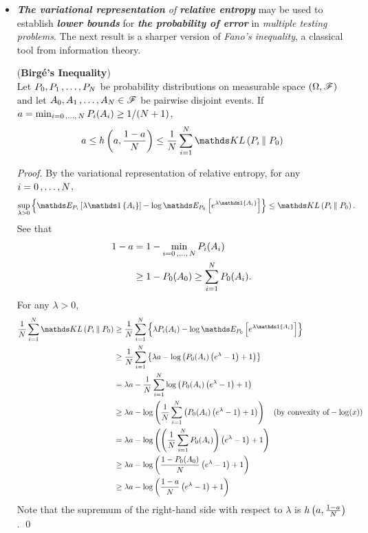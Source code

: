 \documentclass[11pt]{article}
\begin{document}
\begin{itemize}
\item \begin{remark}
\emph{\textbf{The variational representation} of \textbf{relative entropy}} may be used to establish \emph{\textbf{lower bounds}} for \emph{\textbf{the probability of error}} in \emph{multiple testing problems}. The next result is a sharper version of \emph{Fano's inequality}, a classical tool from information theory.
\end{remark}

\begin{proposition} (\textbf{Birg{\'e}'s Inequality})  \citep{boucheron2013concentration}\\
Let $P_0, P_1 \,{,}\ldots{,}\, P_N$ be probability distributions on measurable space $(\Omega, {\mathscr F})$  and let $A_0, A_1 \,{,}\ldots{,}\, A_N \in {\mathscr F}$ be pairwise disjoint events. If $a = \min_{i=0 \,{,}\ldots{,}\, N}P_{i}(A_i) \ge 1/(N+1)$,
\begin{align}
a \le h\paren{a, \frac{1 - a}{N}} \le \frac{1}{N}\sum_{i=1}^{N}\kl{P_i}{P_0} \label{ineqn: birge_inequality}
\end{align}
\end{proposition}
\begin{proof}
By the variational representation of relative entropy, for any $i=0 \,{,}\ldots{,}\, N$, 
\begin{align*}
\sup_{\lambda > 0}\set{\E{P_i}{\lambda \ind{A_i}} - \log\E{P_0}{e^{\lambda \ind{A_i}}}} &\le \kl{P_i}{P_0}.
\end{align*} See that 
\begin{align*}
1 - a&= 1 - \min_{i=0 \,{,}\ldots{,}\, N}P_{i}(A_i)\\
&\ge 1- P_{0}(A_0) \ge \sum_{i=1}^{N}P_{0}(A_i).
\end{align*} For any $\lambda >0$, 
\begin{align*}
\frac{1}{N}\sum_{i=1}^{N}\kl{P_i}{P_0} &\ge \frac{1}{N}\sum_{i=1}^{N}\set{\lambda P_i(A_i) - \log\E{P_0}{e^{\lambda \ind{A_i}}}} \\
&\ge \frac{1}{N}\sum_{i=1}^{N}\set{\lambda a  - \log\paren{P_0(A_i)\paren{e^{\lambda} - 1} + 1}} \\
&= \lambda a  - \frac{1}{N}\sum_{i=1}^{N}\log\paren{P_0(A_i)\paren{e^{\lambda} - 1} + 1} \\
& \ge \lambda a  - \log\paren{\frac{1}{N}\sum_{i=1}^{N}\paren{P_0(A_i)\paren{e^{\lambda} - 1} + 1}}  \quad (\text{by convexity of}-\log(x))\\
& = \lambda a  - \log\paren{\paren{\frac{1}{N}\sum_{i=1}^{N}P_0(A_i)}\paren{e^{\lambda} - 1} + 1  } \\
& \ge \lambda a  -  \log\paren{\frac{1 - P_0(A_0)}{N}\paren{e^{\lambda} - 1} + 1 }\\
&\ge \lambda a  - \log\paren{\frac{1 - a}{N}\paren{e^{\lambda} - 1} + 1 }
\end{align*} Note that the supremum of the right-hand side with respect to $\lambda$ is $h\left(a, \frac{1- a}{N}\right)$. \qed
\end{proof}


\end{itemize}

\newpage


\end{document}
